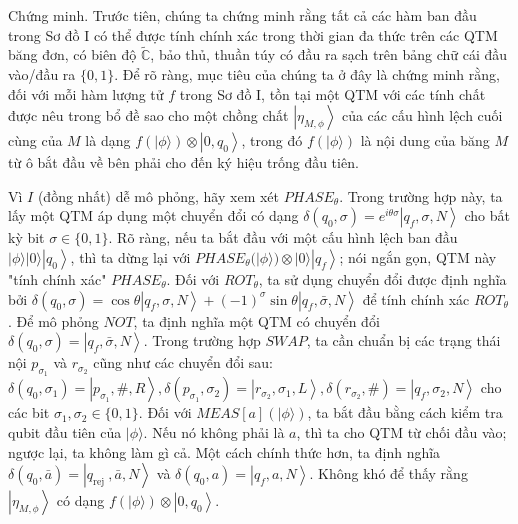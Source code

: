 \documentclass[10pt]{article}
\begin{document}
Chứng minh. Trước tiên, chúng ta chứng minh rằng tất cả các hàm ban đầu trong Sơ đồ I có thể được tính chính xác trong thời gian đa thức trên các QTM băng đơn, có biên độ $\tilde{\mathbb{C}}$, bảo thủ, thuần túy có đầu ra sạch trên bảng chữ cái đầu vào/đầu ra $\{0,1\}$. Để rõ ràng, mục tiêu của chúng ta ở đây là chứng minh rằng, đối với mỗi hàm lượng tử $f$ trong Sơ đồ I, tồn tại một QTM với các tính chất được nêu trong bổ đề sao cho một chồng chất $\left|\eta_{M, \phi}\right\rangle$ của các cấu hình lệch cuối cùng của $M$ là dạng $f(|\phi\rangle) \otimes\left|0, q_{0}\right\rangle$, trong đó $f(|\phi\rangle)$ là nội dung của băng $M$ từ ô bắt đầu về bên phải cho đến ký hiệu trống đầu tiên.

Vì $I$ (đồng nhất) dễ mô phỏng, hãy xem xét $P H A S E_{\theta}$. Trong trường hợp này, ta lấy một QTM áp dụng một chuyển đổi có dạng $\delta\left(q_{0}, \sigma\right)=e^{i \theta \sigma}\left|q_{f}, \sigma, N\right\rangle$ cho bất kỳ bit $\sigma \in\{0,1\}$. Rõ ràng, nếu ta bắt đầu với một cấu hình lệch ban đầu $|\phi\rangle|0\rangle\left|q_{0}\right\rangle$, thì ta dừng lại với $P H A S E_{\theta}(|\phi\rangle) \otimes|0\rangle\left|q_{f}\right\rangle$; nói ngắn gọn, QTM này "tính chính xác" $P H A S E_{\theta}$. Đối với $R O T_{\theta}$, ta sử dụng chuyển đổi được định nghĩa bởi $\delta\left(q_{0}, \sigma\right)=\cos \theta\left|q_{f}, \sigma, N\right\rangle+(-1)^{\sigma} \sin \theta\left|q_{f}, \bar{\sigma}, N\right\rangle$ để tính chính xác $R O T_{\theta}$. Để mô phỏng $N O T$, ta định nghĩa một QTM có chuyển đổi $\delta\left(q_{0}, \sigma\right)=\left|q_{f}, \bar{\sigma}, N\right\rangle$. Trong trường hợp $S W A P$, ta cần chuẩn bị các trạng thái nội $p_{\sigma_{1}}$ và $r_{\sigma_{2}}$ cũng như các chuyển đổi sau: $\delta\left(q_{0}, \sigma_{1}\right)=\left|p_{\sigma_{1}}, \#, R\right\rangle, \delta\left(p_{\sigma_{1}}, \sigma_{2}\right)=\left|r_{\sigma_{2}}, \sigma_{1}, L\right\rangle, \delta\left(r_{\sigma_{2}}, \#\right)=\left|q_{f}, \sigma_{2}, N\right\rangle$ cho các bit $\sigma_{1}, \sigma_{2} \in\{0,1\}$. Đối với $M E A S[a](|\phi\rangle)$, ta bắt đầu bằng cách kiểm tra qubit đầu tiên của $|\phi\rangle$. Nếu nó không phải là $a$, thì ta cho QTM từ chối đầu vào; ngược lại, ta không làm gì cả. Một cách chính thức hơn, ta định nghĩa $\delta\left(q_{0}, \bar{a}\right)=\left|q_{\text {rej }}, \bar{a}, N\right\rangle$ và $\delta\left(q_{0}, a\right)=\left|q_{f}, a, N\right\rangle$. Không khó để thấy rằng $\left|\eta_{M, \phi}\right\rangle$ có dạng $f(|\phi\rangle) \otimes\left|0, q_{0}\right\rangle$.
\end{document}
